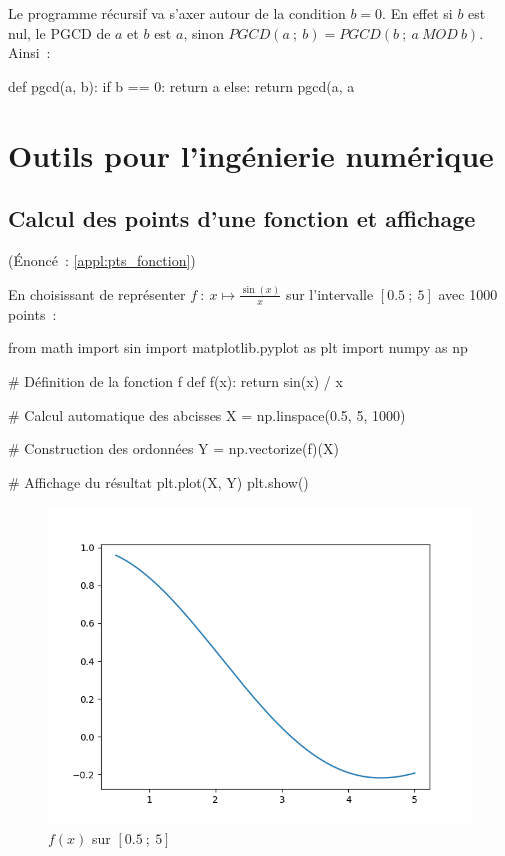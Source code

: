 		Le programme récursif va s'axer autour de la condition $b = 0$. En effet si $b$ est nul, le PGCD de $a$ et $b$ est $a$, sinon $PGCD(a~;\ b) = PGCD(b~;\ a \ MOD\ b)$. Ainsi~:
		\begin{pythoncode}
			def pgcd(a, b):
				if b == 0:
					return a
				else:
					return pgcd(a, a %
		\end{pythoncode}

\section{Outils pour l'ingénierie numérique}
	
	\subsection{Calcul des points d'une fonction et affichage} \label{corr:pts_fonction} (Énoncé~: \ref{appl:pts_fonction})
	
		En choisissant de représenter $f~:\ x \mapsto \frac{\sin(x)}{x}$ sur l'intervalle $[0.5~;\ 5]$ avec 1000 points~:
		\begin{pythoncode}
			from math import sin
			import matplotlib.pyplot as plt
			import numpy as np
			
			# Définition de la fonction f
			def f(x):
				return sin(x) / x
			
			# Calcul automatique des abcisses
			X = np.linspace(0.5, 5, 1000)
			
			# Construction des ordonnées
			Y = np.vectorize(f)(X)
			
			# Affichage du résultat
			plt.plot(X, Y)
			plt.show()
		\end{pythoncode}
		\begin{figure}[h]
			\centering
			\includegraphics[scale=0.60]{images/Figure_2.png}
			\caption{$f(x)$ sur $[0.5~;\ 5]$}
		\end{figure}

